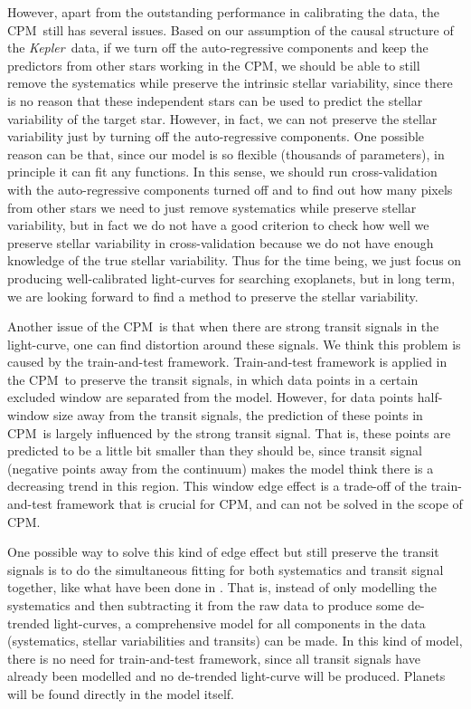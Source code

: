 \documentclass[12pt, preprint]{aastex}
\newcommand{\project}[1]{\textsl{#1}}
\newcommand{\Kepler}{\project{Kepler}}
\newcommand{\name}{CPM}
\begin{document}
However, apart from the outstanding performance in calibrating the data, the \name\ still has several issues. 
Based on our assumption of the causal structure of the \Kepler\ data, 
  if we turn off the auto-regressive components and keep the predictors from other stars working in the \name, 
  we should be able to still remove the systematics while preserve the intrinsic stellar variability, 
  since there is no reason that these independent stars can be used to predict the stellar variability of the target star.
However, in fact, we can not preserve the stellar variability just by turning off the auto-regressive components. 
One possible reason can be that, since our model is so flexible (thousands of parameters), 
  in principle it can fit any functions. 
In this sense, 
  we should run cross-validation with the auto-regressive components turned off 
  and to find out how many pixels from other stars we need to just remove systematics 
  while preserve stellar variability, 
  but in fact we do not have a good criterion to check how well we preserve stellar variability in cross-validation 
  because we do not have enough knowledge of the true stellar variability. 
Thus for the time being, we just focus on producing well-calibrated light-curves for searching exoplanets, 
  but in long term, we are looking forward to find a method to preserve the stellar variability.

Another issue of the \name\ is that when there are strong transit signals in the light-curve,  
  one can find distortion around these signals.
We think this problem is caused by the train-and-test framework.
Train-and-test framework is applied in the \name\ to preserve the transit signals, 
  in which data points in a certain excluded window are separated from the model.
However, for data points half-window size away from the transit signals, 
  the prediction of these points in \name\ is largely influenced by the strong transit signal.
That is,  these points are predicted to be a little bit smaller than they should be, 
  since transit signal (negative points away from the continuum) makes the model think
  there is a decreasing trend in this region.
This window edge effect is a trade-off of the train-and-test framework that is crucial for \name,
 and can not be solved in the scope of \name.

One possible way to solve this kind of edge effect 
  but still preserve the transit signals is to do the simultaneous fitting 
  for both systematics and transit signal together, 
  like what have been done in \cite{dfm}. 
That is,  
  instead of only modelling the systematics 
  and then subtracting it from the raw data to produce some de-trended light-curves,
  a comprehensive model for all components in the data (systematics, stellar variabilities and transits)  can be made. In this kind of model, there is no need for train-and-test framework,
  since all transit signals have already been modelled 
  and no de-trended light-curve will be produced. Planets will be found directly in the model itself. 
\end{document}
